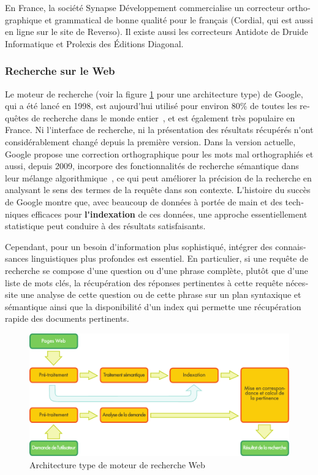 \begin{french}
\begin{multicols}{2}
En France, la société Synapse Développement commercialise un
correcteur orthographique et grammatical de bonne qualité pour le
français (Cordial, qui est aussi en ligne sur le site de Reverso). Il
existe aussi les correcteurs Antidote de Druide Informatique et
Prolexis des Éditions Diagonal.

\subsubsection{Recherche sur le Web}
Le moteur de recherche (voir la figure \ref{fig:archiweb} pour une
architecture type) de Google, qui a été lancé en 1998, est aujourd{\mbox '}hui 
utilisé pour environ 80\% de toutes les requêtes de recherche
dans le monde entier~\cite{googleworld}, et est également très
populaire en France. Ni l{\mbox '}interface de recherche, ni la présentation
des résultats récupérés n{\mbox '}ont considérablement changé depuis la
première version. Dans la version actuelle, Google propose une
correction orthographique pour les mots mal orthographiés et aussi,
depuis 2009, incorpore des fonctionnalités de recherche sémantique
dans leur mélange algorithmique~\cite{googlesemantics}, ce qui peut
améliorer la précision de la recherche en analysant le sens des termes
de la requête dans son contexte. L{\mbox '}histoire du succès de Google montre
que, avec beaucoup de données à portée de main et des techniques
efficaces pour {\bf l{\mbox '}indexation} de ces données, une approche
essentiellement statistique peut conduire à des résultats
satisfaisants.

Cependant, pour un besoin d{\mbox '}information plus sophistiqué, intégrer des
connaissances linguistiques plus profondes est essentiel. En
particulier, si une requête de recherche se compose d{\mbox '}une question ou
d{\mbox '}une phrase complète, plutôt que d{\mbox '}une liste de mots clés, la
récupération des réponses pertinentes à cette requête nécessite une
analyse de cette question ou de cette phrase sur un plan syntaxique et
sémantique ainsi que la disponibilité d{\mbox '}un index qui permette une
récupération rapide des documents pertinents.

\begin{figure}[t]
\begin{center}
 \includegraphics[width=\textwidth]{../_media/french/web_search_architecture}
 \caption{Architecture type de moteur de recherche Web}
\label{fig:archiweb}
\end{center}
\end{figure}


\end{multicols}
\end{french}
